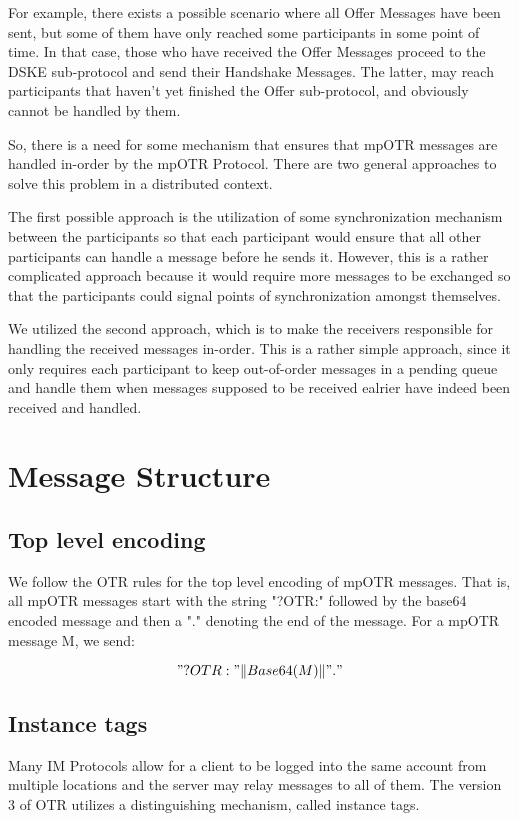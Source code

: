 For example, there exists a possible scenario where all Offer Messages have been sent, but some of them have only reached some participants in some point of time. In that case, those who have received the Offer Messages proceed to the DSKE sub-protocol and send their Handshake Messages. The latter, may reach participants that haven't yet finished the Offer sub-protocol, and obviously cannot be handled by them.

So, there is a need for some mechanism that ensures that mpOTR messages are handled in-order by the mpOTR Protocol. There are two general approaches to solve this problem in a distributed context.

The first possible approach is the utilization of some synchronization mechanism between the participants so that each participant would ensure that all other participants can handle a message before he sends it. However, this is a rather complicated approach because it would require more messages to be exchanged so that the participants could signal points of synchronization amongst themselves.

We utilized the second approach, which is to make the receivers responsible for handling the received messages in-order. This is a rather simple approach, since it only requires each participant to keep out-of-order messages in a pending queue and handle them when messages supposed to be received ealrier have indeed been received and handled.



\section{Message Structure}
\label{sections:message_structure}

\subsection{Top level encoding}
We follow the OTR rules for the top level encoding of mpOTR messages. That is, all mpOTR messages start with the string "?OTR:" followed by the base64 encoded message and then a "." denoting the end of the message. For a mpOTR message M, we send:

\[
  "?OTR:" \Vert Base64(M) \Vert "."
\]

\subsection{Instance tags}
\label{subsections:instance_tags}
Many IM Protocols allow for a client to be logged into the same account from multiple locations and the server may relay messages to all of them. The version 3 of OTR utilizes a distinguishing mechanism, called instance tags.

